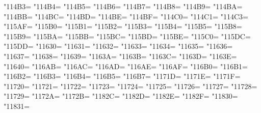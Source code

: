 \XeTeXcharclass"114B3=\KclassCM
\XeTeXcharclass"114B4=\KclassCM
\XeTeXcharclass"114B5=\KclassCM
\XeTeXcharclass"114B6=\KclassCM
\XeTeXcharclass"114B7=\KclassCM
\XeTeXcharclass"114B8=\KclassCM
\XeTeXcharclass"114B9=\KclassCM
\XeTeXcharclass"114BA=\KclassCM
\XeTeXcharclass"114BB=\KclassCM
\XeTeXcharclass"114BC=\KclassCM
\XeTeXcharclass"114BD=\KclassCM
\XeTeXcharclass"114BE=\KclassCM
\XeTeXcharclass"114BF=\KclassCM
\XeTeXcharclass"114C0=\KclassCM
\XeTeXcharclass"114C1=\KclassCM
\XeTeXcharclass"114C3=\KclassCM
\XeTeXcharclass"115AF=\KclassCM
\XeTeXcharclass"115B0=\KclassCM
\XeTeXcharclass"115B1=\KclassCM
\XeTeXcharclass"115B2=\KclassCM
\XeTeXcharclass"115B3=\KclassCM
\XeTeXcharclass"115B4=\KclassCM
\XeTeXcharclass"115B5=\KclassCM
\XeTeXcharclass"115B8=\KclassCM
\XeTeXcharclass"115B9=\KclassCM
\XeTeXcharclass"115BA=\KclassCM
\XeTeXcharclass"115BB=\KclassCM
\XeTeXcharclass"115BC=\KclassCM
\XeTeXcharclass"115BD=\KclassCM
\XeTeXcharclass"115BE=\KclassCM
\XeTeXcharclass"115C0=\KclassCM
\XeTeXcharclass"115DC=\KclassCM
\XeTeXcharclass"115DD=\KclassCM
\XeTeXcharclass"11630=\KclassCM
\XeTeXcharclass"11631=\KclassCM
\XeTeXcharclass"11632=\KclassCM
\XeTeXcharclass"11633=\KclassCM
\XeTeXcharclass"11634=\KclassCM
\XeTeXcharclass"11635=\KclassCM
\XeTeXcharclass"11636=\KclassCM
\XeTeXcharclass"11637=\KclassCM
\XeTeXcharclass"11638=\KclassCM
\XeTeXcharclass"11639=\KclassCM
\XeTeXcharclass"1163A=\KclassCM
\XeTeXcharclass"1163B=\KclassCM
\XeTeXcharclass"1163C=\KclassCM
\XeTeXcharclass"1163D=\KclassCM
\XeTeXcharclass"1163E=\KclassCM
\XeTeXcharclass"11640=\KclassCM
\XeTeXcharclass"116AB=\KclassCM
\XeTeXcharclass"116AC=\KclassCM
\XeTeXcharclass"116AD=\KclassCM
\XeTeXcharclass"116AE=\KclassCM
\XeTeXcharclass"116AF=\KclassCM
\XeTeXcharclass"116B0=\KclassCM
\XeTeXcharclass"116B1=\KclassCM
\XeTeXcharclass"116B2=\KclassCM
\XeTeXcharclass"116B3=\KclassCM
\XeTeXcharclass"116B4=\KclassCM
\XeTeXcharclass"116B5=\KclassCM
\XeTeXcharclass"116B7=\KclassCM
\XeTeXcharclass"1171D=\KclassCM
\XeTeXcharclass"1171E=\KclassCM
\XeTeXcharclass"1171F=\KclassCM
\XeTeXcharclass"11720=\KclassCM
\XeTeXcharclass"11721=\KclassCM
\XeTeXcharclass"11722=\KclassCM
\XeTeXcharclass"11723=\KclassCM
\XeTeXcharclass"11724=\KclassCM
\XeTeXcharclass"11725=\KclassCM
\XeTeXcharclass"11726=\KclassCM
\XeTeXcharclass"11727=\KclassCM
\XeTeXcharclass"11728=\KclassCM
\XeTeXcharclass"11729=\KclassCM
\XeTeXcharclass"1172A=\KclassCM
\XeTeXcharclass"1172B=\KclassCM
\XeTeXcharclass"1182C=\KclassCM
\XeTeXcharclass"1182D=\KclassCM
\XeTeXcharclass"1182E=\KclassCM
\XeTeXcharclass"1182F=\KclassCM
\XeTeXcharclass"11830=\KclassCM
\XeTeXcharclass"11831=\KclassCM
